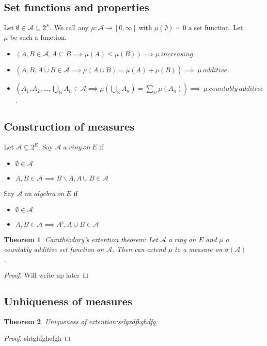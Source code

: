 \documentclass{article}
\newtheorem{theorem}{Theorem}[section]
\begin{document}
\subsection{Set functions and properties}
Let $\emptyset\in\mathcal{A}\subseteq2^E$.  We call any $\mu:\mathcal{A}\rightarrow[0,\infty]$ with $\mu(\emptyset)=0$ a set function.  Let $\mu$ be such a function.
\begin{itemize}
  \item $(A,B\in\mathcal{A},A\subseteq B \implies \mu(A)\leq\mu(B))\implies \mu~increasing$.
  \item $(A,B,A\dot{\cup} B \in \mathcal{A}\implies \mu(A\cup B)=\mu(A)+\mu(B))\implies~\mu~additive$.
  \item $(A_1,A_2,...,\dot{\bigcup}_\mathbb{N} A_n \in \mathcal{A}\implies \mu(\bigcup_\mathbb{N}A_n)=\sum_\mathbb{N}\mu(A_n))\implies~\mu~countably~additive$.
\end{itemize}

\subsection{Construction of measures}
Let $\mathcal{A}\subseteq2^E$.  Say $\mathcal{A}$ a $ring~on~E$ if
\begin{itemize}
  \item $\emptyset\in\mathcal{A}$
  \item $A,B\in\mathcal{A}\implies B\backslash A,A\cup B\in\mathcal{A}$
\end{itemize}
Say $\mathcal{A}$ an $algebra~on~E$ if
\begin{itemize}
  \item $\emptyset\in\mathcal{A}$
  \item $A,B\in\mathcal{A}\implies A^c,A\cup B\in\mathcal{A}$
\end{itemize}
\begin{theorem}
  Carath\'eodory's extention theorem: Let $\mathcal{A}$ a ring on $E$ and $\mu$ a countably additive set function on $\mathcal{A}$.  Then can extend $\mu$ to a measure on $\sigma(\mathcal{A})$.
\end{theorem}
\begin{proof}
  Will write up later
\end{proof}
\subsection{Unhiqueness of measures}
\begin{theorem}
  Uniqueness of extention:srlgxdfkghdfg
\end{theorem}
\begin{proof}
  shtghfghcfgh
\end{proof}
\end{document}
